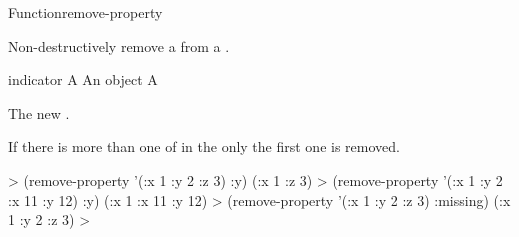 \documentclass[10pt,twoside,english,pdftex]{article}
\begin{document}

\begin{functiondoc}{Function}{remove-property}{ 
  \returns{} } 
%
%
  
\fnsyntax

\fnpurpose Non-destructively remove a  from a
. 

\fnpackage {}

\fnmodule {}

\fnargs
\begin{args}{indicator}
\arg[plist] A 
\arg[indicator] An object
 A 
\end{args}

\fnreturns The new . 

\fndescription If there is more than one  of
 in the  only the first one is
removed.

\fnexamples
%
\W\supp
\begin{example}
  > (remove-property '(:x 1 :y 2 :z 3) :y)
  (:x 1 :z 3)
  > (remove-property '(:x 1 :y 2 :x 11 :y 12) :y)
  (:x 1 :x 11 :y 12)
  > (remove-property '(:x 1 :y 2 :z 3) :missing)
  (:x 1 :y 2 :z 3)
  >
\end{example}

\end{functiondoc}

\end{document}
